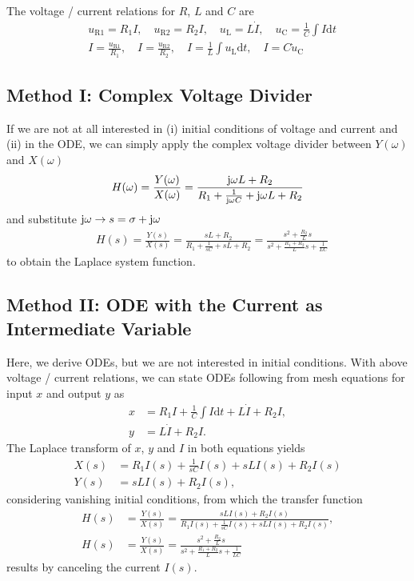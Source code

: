 \documentclass[a4paper,11pt,oneside]{scrartcl}
\newcommand\uc{u_\mathrm{C}}
\newcommand\duc{\dot{u}_\mathrm{C}}
\newcommand\ul{u_\mathrm{L}}
\newcommand\uri{u_\mathrm{R1}}
\newcommand\urii{u_\mathrm{R2}}
\renewcommand\c{I}
\newcommand\dc{\dot{I}}
\newcommand\fsd{\mathrm{d}}
\begin{document}
The voltage / current relations for $R$, $L$ and $C$ are
\begin{align*}
&\uri = R_1 \c, \quad \urii = R_2 \c, \quad \ul = L \dc, \quad \uc = \frac{1}{C}\int \c \fsd t\\
&\c = \frac{\uri}{R_1}, \quad \c = \frac{\urii}{R_2}, \quad \c = \frac{1}{L} \int \ul \fsd t, \quad \c = C \duc
\end{align*}

\subsection{Method I: Complex Voltage Divider}
%
If we are not at all interested in (i) initial conditions of voltage and
current and (ii) in the ODE, we can simply apply the complex voltage
divider between $Y(\omega)$ and $X(\omega)$
%
\begin{align}
H(\omega) = \frac{Y(\omega)}{X(\omega)} =
\frac{\im \omega L + R_2}{R_1 + \frac{1}{\im \omega C} + \im \omega L + R_2}
\end{align}
%
and substitute $\im \omega \rightarrow s = \sigma + \im\omega$
%
\begin{align}
&H(s) = \frac{Y(s)}{X(s)} = \frac{s L + R_2}{R_1 + \frac{1}{s C} + s L + R_2}=
\frac{s^2 + \frac{R_2}{L} s}{s^2 + \frac{R_1 + R_2}{L} s + \frac{1}{L C}}
\end{align}
%
to obtain the Laplace system function.
%
\subsection{Method II: ODE with the Current as Intermediate Variable}
%
Here, we derive ODEs, but we are not interested in initial conditions.
With above voltage / current relations, we can state ODEs following from mesh
equations for input $x$ and output $y$ as
%
\begin{align}
x& = R_1 \c + \frac{1}{C} \int \c \fsd t + L \dc + R_2 \c,\\
y& = L \dc + R_2 \c.
\end{align}
%
The Laplace transform of $x$, $y$ and $\c$ in both equations yields
%
\begin{align}
X(s)& = R_1 \c(s) + \frac{1}{s C} \c(s) + s L \c(s) + R_2 \c(s)\\
Y(s)& = s L \c(s) + R_2 \c(s),
\end{align}
%
considering vanishing initial conditions,
%
from which the transfer function
%
\begin{align}
H(s)& = \frac{Y(s)}{X(s)} = \frac{s L \c(s) + R_2 \c(s)}{R_1 \c(s) + \frac{1}{sC} \c(s) + s L \c(s) + R_2 \c(s)},\\
H(s)& = \frac{Y(s)}{X(s)} = \frac{s^2 + \frac{R_2}{L} s}{s^2 + \frac{R_1+R_2}{L} s + \frac{1}{L C}}
\end{align}
%
results by canceling the current $I(s)$.
\end{document}
